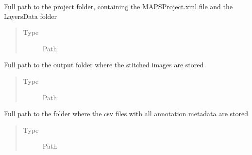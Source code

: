 \documentclass[letterpaper,10pt,english]{sphinxmanual}
\begin{document}
\begin{fulllineitems}
\begin{fulllineitems}
\label{\detokenize{index:stitch_MAPS_annotations.Stitcher.project_folder_path}}
Full path to the project folder, containing the MAPSProject.xml file and the
LayersData folder
\begin{quote}\begin{description}
\item[{Type}] \leavevmode
Path

\end{description}\end{quote}

\end{fulllineitems}


\begin{fulllineitems}
\label{\detokenize{index:stitch_MAPS_annotations.Stitcher.output_path}}
Full path to the output folder where the stitched images are stored
\begin{quote}\begin{description}
\item[{Type}] \leavevmode
Path

\end{description}\end{quote}

\end{fulllineitems}


\begin{fulllineitems}
\label{\detokenize{index:stitch_MAPS_annotations.Stitcher.csv_base_path}}
Full path to the folder where the csv files with all annotation metadata are stored
\begin{quote}\begin{description}
\item[{Type}] \leavevmode
Path

\end{description}\end{quote}

\end{fulllineitems}


\end{fulllineitems}
\end{document}
